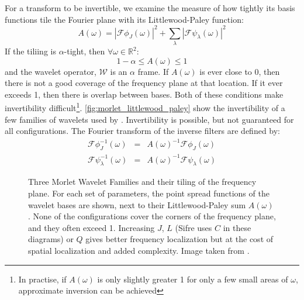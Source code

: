   For a transform to be invertible, we examine the measure of how tightly its
  basis functions tile the Fourier plane with its Littlewood-Paley function:  
  \begin{equation}
    A(\omega) = {|\mathcal{F}\phi_J(\omega)|}^2
    + \sum_{\lambda} {|\mathcal{F}\psi_{\lambda}(\omega)|}^2
  \end{equation}
  If the tiliing is $\alpha$-tight, then $\forall \omega \in \mathbb{R}^2$:
  \begin{equation}
    1-\alpha \le A(\omega) \le 1
  \end{equation}
  and the wavelet operator, $\mathcal{W}$ is an $\alpha$ frame. If $A(\omega)$
  is ever close to 0, then there is not a good coverage of the frequency plane
  at that location. If it ever exceeds 1, then there is overlap between bases.
  Both of these conditions make invertibility difficult\footnote{In practise,
  if $A(\omega)$ is only slightly greater 1 for only a few small areas of
  $\omega$, approximate inversion can be achieved}.
  \autoref{fig:morlet_littlewood_paley} show the invertibility of a few
  families of wavelets used by \Mallat. Invertibility is possible, but not
  guaranteed for all configurations. The Fourier transform of the inverse
  filters are defined by:
  \begin{eqnarray}
    \mathcal{F}\phi_J^{-1}(\omega) &=& A(\omega)^{-1} \mathcal{F}\phi_J(\omega) \\
    \mathcal{F}\psi_{\lambda}^{-1}(\omega) &=& A(\omega)^{-1}
      \mathcal{F}\psi_{\lambda}(\omega) 
  \end{eqnarray}

  \begin{figure}
    \centering
      \makebox[\textwidth][c]{%
      }
      \caption[Three Morlet Wavelet Families and their tiling of the frequency
              plane]
              {Three Morlet Wavelet Families and their tiling of the frequency
              plane. For each set of parameters, the point spread functions of
              the wavelet bases are shown, next to their Littlewood-Paley sum
              $A(\omega)$. None of the configurations cover the corners of the
              frequency plane, and they often exceed 1. 
              Increasing $J$, $L$ (Sifre uses $C$ in these
              diagrams) or $Q$ gives better frequency localization but at the
              cost of spatial localization and added complexity. Image taken
              from \citep{sifre_rigid-motion_2014-1}.}
      \label{fig:morlet_littlewood_paley}
  \end{figure}


